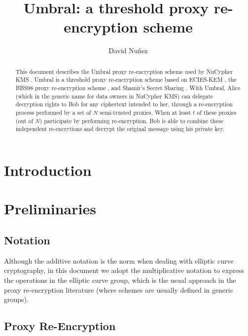 \documentclass[12pt]{article}
\title{Umbral: a threshold proxy re-encryption scheme}
\author{David Nuñez}
\date{} %
\begin{document}
\maketitle

\begin{abstract}
This document describes the Umbral proxy re-encryption scheme used by NuCypher KMS \cite{egorov2017nucypherkms}. 
Umbral is a threshold proxy re-encryption scheme based on ECIES-KEM \cite{ansi-x9.63}, the BBS98 proxy re-encryption scheme  \cite{blaze1998divertible}, and Shamir's Secret Sharing \cite{shamir1979share}. 
With Umbral, Alice (which in the generic name for data owners in NuCypher KMS) can delegate decryption rights to Bob for any ciphertext intended to her, through a re-encryption process performed by a set of $N$ semi-trusted proxies. When at least $t$ of these proxies (out of $N$) participate by performing re-encryption, Bob is able to combine these independent re-encrytions and decrypt the original message using his private key. 
\end{abstract}



\section{Introduction}





\section{Preliminaries}

\subsection{Notation}

Although the additive notation is the norm when dealing with elliptic curve cryptography, in this document we adopt the multiplicative notation to express the operations in the elliptic curve group, which is the usual approach in the proxy re-encryption literature (where schemes are usually defined in generic groups).

\subsection{Proxy Re-Encryption}
\end{document}
